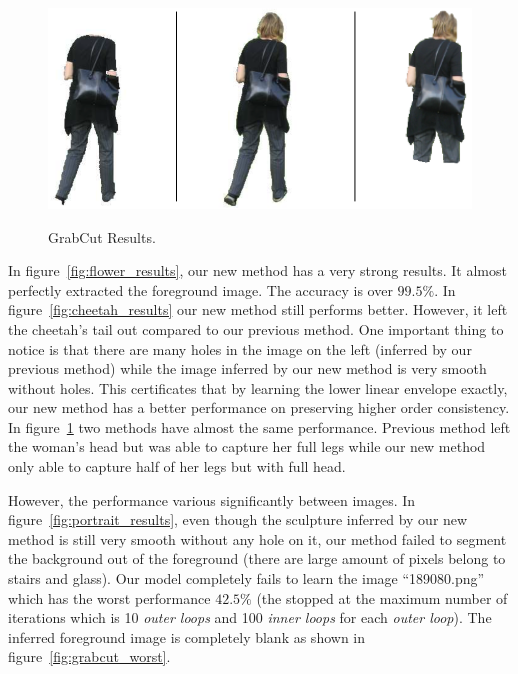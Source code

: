 \begin{figure}[ht]
  \begin{center} \setlength{\tabcolsep}{0pt}
    \includegraphics[width=\linewidth]{Experiments/figures/person5.png}\\
  \caption{\label{fig:person_results}GrabCut Results.}
  \end{center}
\end{figure}

In figure~\ref{fig:flower_results}, our new method has a very
strong results. It almost perfectly extracted the foreground
image. The accuracy is over $99.5\%$. In
figure~\ref{fig:cheetah_results} our new method still performs
better. However, it left the cheetah's tail out compared to our
previous method. One important thing to notice is that there are
many holes in the image on the left (inferred by our previous
method) while the image inferred by our new method is very smooth
without holes. This certificates that by learning the lower
linear envelope exactly, our new method has a better performance
on preserving higher order consistency. In
figure~\ref{fig:person_results} two methods have almost the same
performance. Previous method left the woman's head but was
able to capture her full legs while our new method only able to
capture half of her legs but with full head.

\bigskip
\bigskip
\bigskip
\bigskip

However, the performance various significantly between images. In
figure~\ref{fig:portrait_results}, even though the sculpture
inferred by our new method is still very smooth without any hole
on it, our method failed to segment the background out of the
foreground (there are large amount of pixels belong to stairs and
glass). Our model completely fails to learn the image
``189080.png'' which has the worst performance $42.5\%$ (the
 stopped at the maximum number of iterations
which is 10 \emph{outer loops} and 100 \emph{inner loops} for
each \emph{outer loop}). The inferred foreground image is
completely blank as shown in figure~\ref{fig:grabcut_worst}.


